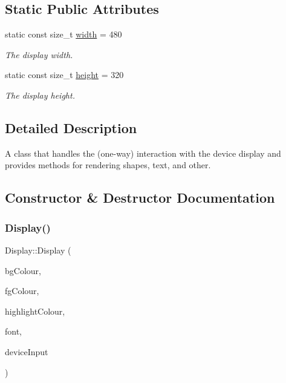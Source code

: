 \subsection*{Static Public Attributes}
\begin{DoxyCompactItemize}
\item 
\mbox{\label{classDisplay_a6f1dec624224569510e05c937d33ac4d}} 
static const size\+\_\+t \mbox{\hyperlink{classDisplay_a6f1dec624224569510e05c937d33ac4d}{width}} = 480
\begin{DoxyCompactList}\small\item\em The display width. \end{DoxyCompactList}\item 
\mbox{\label{classDisplay_ac677f0db63e8eef2373fe84791cad17c}} 
static const size\+\_\+t \mbox{\hyperlink{classDisplay_ac677f0db63e8eef2373fe84791cad17c}{height}} = 320
\begin{DoxyCompactList}\small\item\em The display height. \end{DoxyCompactList}\end{DoxyCompactItemize}


\subsection{Detailed Description}
A class that handles the (one-\/way) interaction with the device display and provides methods for rendering shapes, text, and other. 

\subsection{Constructor \& Destructor Documentation}
\mbox{\label{classDisplay_a4cc5e14106323089582385c898cc234b}} 
\subsubsection{\texorpdfstring{Display()}{Display()}}
{\footnotesize\ttfamily Display\+::\+Display (\begin{DoxyParamCaption}\item[{uint16\+\_\+t}]{bg\+Colour,  }\item[{uint16\+\_\+t}]{fg\+Colour,  }\item[{uint16\+\_\+t}]{highlight\+Colour,  }\item[{\mbox{\hyperlink{structfont__descriptor__t}{font\+\_\+descriptor\+\_\+t}}}]{font,  }\item[{\mbox{\hyperlink{classDeviceInput}{Device\+Input}} $\ast$}]{device\+Input }\end{DoxyParamCaption})}



